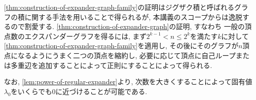 \cref{thm:construction-of-expander-graph-family}の証明はジグザク積と呼ばれるグラフの積に関する手法を用いることで得られるが, 本講義のスコープからは逸脱するので割愛する.
\cref{thm:construction-of-expander-graph}の証明, すなわち
一般の頂点数のエクスパンダーグラフを得るには, まず$2^{k-1}< n \le 2^k$を満たす$k$に対して\cref{thm:construction-of-expander-graph-family}を適用し, その後にそのグラフが$n$頂点になるようにうまく二つの頂点を縮約し, 必要に応じて頂点に自己ループまたは多重辺を追加することによって正則にすることによって得られる.


なお, \cref{lem:power-of-regular-expander}より, 次数を大きくすることによって固有値$\lambda_0$をいくらでも$0$に近づけることが可能である.






